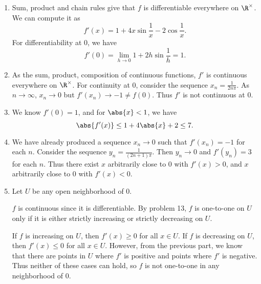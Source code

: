 \documentclass[12pt]{article}
\begin{document}
\begin{solution} \leavevmode
    \begin{enumerate}
        \item Sum, product and chain rules give that
        $f$ is differentiable everywhere on $\R^\times$.
        We can compute it as \[
            f'(x) = 1 + 4x \sin\frac1x - 2\cos\frac1x.
        \] For differentiability at $0$, we have \[
            f'(0) = \lim_{h \to 0} 1 + 2h\sin\frac1h = 1.
        \]
        \item As the sum, product, composition of continuous functions,
        $f'$ is continuous everywhere on $\R^\times$.
        For continuity at $0$, consider the sequence $x_n = \frac1{2n\pi}$.
        As $n \to \infty$, $x_n \to 0$ but $f'(x_n) \to -1 \ne f(0)$.
        Thus $f'$ is not continuous at $0$.
        \item We know $f'(0) = 1$, and for $\abs{x} < 1$, we have \[
            \abs{f'(x)} \le 1 + 4\abs{x} + 2 \le 7.
        \]
        \item We have already produced a sequence $x_n \to 0$ such that
        $f'(x_n) = -1$ for each $n$.
        Consider the sequence $y_n = \frac1{(2n + 1)\pi}$.
        Then $y_n \to 0$ and $f'(y_n) = 3$ for each $n$.
        Thus there exist $x$ arbitrarily close to $0$ with $f'(x) > 0$,
        and $x$ arbitrarily close to $0$ with $f'(x) < 0$.
        \item Let $U$ be any open neighborhood of $0$.

        $f$ is continuous since it is differentiable.
        By problem 13, $f$ is one-to-one on $U$ only if it is either
        strictly increasing or strictly decreasing on $U$.

        If $f$ is increasing on $U$, then $f'(x) \ge 0$ for all $x \in U$.
        If $f$ is decreasing on $U$, then $f'(x) \le 0$ for all $x \in U$.
        However, from the previous part, we know that there are points
        in $U$ where $f'$ is positive and points where $f'$ is negative.
        Thus neither of these cases can hold, so $f$ is not one-to-one
        in any neighborhood of $0$. \qedhere
    \end{enumerate}
\end{solution}
\end{document}
